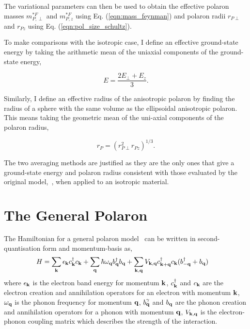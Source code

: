 The variational parameters can then be used to obtain the effective polaron masses $m^{*F}_{P,\perp}$ and $m^{*F}_{P, z}$ using Eq. (\ref{eqn:mass_feynman}) and polaron radii $r_{P\perp}$ and $r_{Pz}$ using Eq. (\ref{eqn:pol_size_schultz}). 

To make comparisons with the isotropic case, I define an effective ground-state energy by taking the arithmetic mean of the uniaxial components of the ground-state energy,

\begin{equation}
    E = \frac{2 E_\perp + E_z}{3}.
\end{equation}

Similarly, I define an effective radius of the anisotropic polaron by finding the radius of a sphere with the same volume as the ellipsoidal anisotropic polaron. This means taking the geometric mean of the uni-axial components of the polaron radius, 

\begin{equation}
    r_P = \left(r^2_{P\perp} r_{Pz}\right)^{1/3}.
\end{equation}

The two averaging methods are justified as they are the only ones that give a ground-state energy and polaron radius consistent with those evaluated by the original model,~\cite{feynman_slow_1955}, when applied to an isotropic material.

\section{The General Polaron}
\label{sec:chap-third-fourth}

The Hamiltonian for a general polaron model~\cite{alexandrov_advances_2010} can be written in second-quantisation form and momentum-basis as,
\begin{equation}
    \begin{aligned}
        H &= \sum_{\vb{k}} \epsilon_{\vb{k}} c^\dagger_{\vb{k}} c_{\vb{k}} + \sum_{\vb{q}} \hbar \omega_{\vb{q}} b^\dagger_{\vb{q}} b_{\vb{q}} + \sum_{\vb{k},\vb{q}} V_{\vb{k}, \vb{q}} c^\dagger_{\vb{k}+\vb{q}} c_{\vb{k}} (b^\dagger_{\vb{-q}} + b_{\vb{q}})
    \end{aligned}
\end{equation} 
where $\epsilon_{\vb{k}}$ is the electron band energy for momentum $\vb{k}$, $c^\dagger_{\vb{k}}$ and $c_{\vb{k}}$ are the electron creation and annihilation operators for an electron with momentum $\vb{k}$, $\omega_{\vb{q}}$ is the phonon frequency for momentum $\vb{q}$, $b^\gamma_{\vb{q}}$ and $b_{\vb{q}}$ are the phonon creation and annihilation operators for a phonon with momentum $\vb{q}$, $V_{\vb{k}, \vb{q}}$ is the electron-phonon coupling matrix which describes the strength of the interaction.

